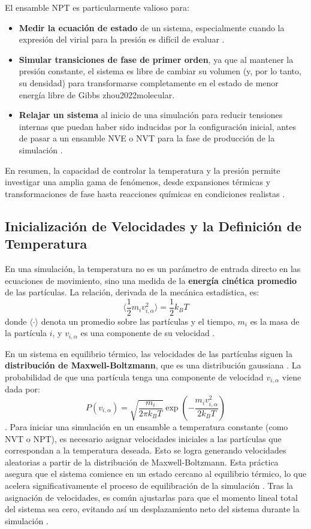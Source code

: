 El ensamble NPT es particularmente valioso para:
\begin{itemize}
    \item \textbf{Medir la ecuación de estado} de un sistema, especialmente cuando la expresión del virial para la presión es difícil de evaluar \cite[209]{frenkel2002understanding}.
    \item \textbf{Simular transiciones de fase de primer orden}, ya que al mantener la presión constante, el sistema es libre de cambiar su volumen (y, por lo tanto, su densidad) para transformarse completamente en el estado de menor energía libre de Gibbs \cite[209, 113]{frenkel2002understanding}{zhou2022molecular}.
    \item \textbf{Relajar un sistema} al inicio de una simulación para reducir tensiones internas que puedan haber sido inducidas por la configuración inicial, antes de pasar a un ensamble NVE o NVT para la fase de producción de la simulación \cite[99]{zhou2022molecular}.
\end{itemize}
En resumen, la capacidad de controlar la temperatura y la presión permite investigar una amplia gama de fenómenos, desde expansiones térmicas y transformaciones de fase hasta reacciones químicas en condiciones realistas \cite[100, 113]{zhou2022molecular}.

\subsection{Inicialización de Velocidades y la Definición de Temperatura}

En una simulación, la temperatura no es un parámetro de entrada directo en las ecuaciones de movimiento, sino una medida de la \textbf{energía cinética promedio} de las partículas. La relación, derivada de la mecánica estadística, es:
$$ \langle \frac{1}{2} m_i v_{i,\alpha}^2 \rangle = \frac{1}{2} k_B T $$
donde $\langle \cdot \rangle$ denota un promedio sobre las partículas y el tiempo, $m_i$ es la masa de la partícula $i$, y $v_{i,\alpha}$ es una componente de su velocidad \cite[43]{zhou2022molecular}.

En un sistema en equilibrio térmico, las velocidades de las partículas siguen la \textbf{distribución de Maxwell-Boltzmann}, que es una distribución gaussiana \cite[43, 82]{zhou2022molecular, haile1992molecular}. La probabilidad de que una partícula tenga una componente de velocidad $v_{i,\alpha}$ viene dada por:
$$ P(v_{i,\alpha}) = \sqrt{\frac{m_i}{2\pi k_B T}} \exp \left( -\frac{m_i v_{i,\alpha}^2}{2k_B T} \right) $$
\cite[43]{zhou2022molecular}.
Para iniciar una simulación en un ensamble a temperatura constante (como NVT o NPT), es necesario asignar velocidades iniciales a las partículas que correspondan a la temperatura deseada. Esto se logra generando velocidades aleatorias a partir de la distribución de Maxwell-Boltzmann. Esta práctica asegura que el sistema comience en un estado cercano al equilibrio térmico, lo que acelera significativamente el proceso de equilibración de la simulación \cite[43]{zhou2022molecular}. Tras la asignación de velocidades, es común ajustarlas para que el momento lineal total del sistema sea cero, evitando así un desplazamiento neto del sistema durante la simulación \cite[43]{zhou2022molecular}.


